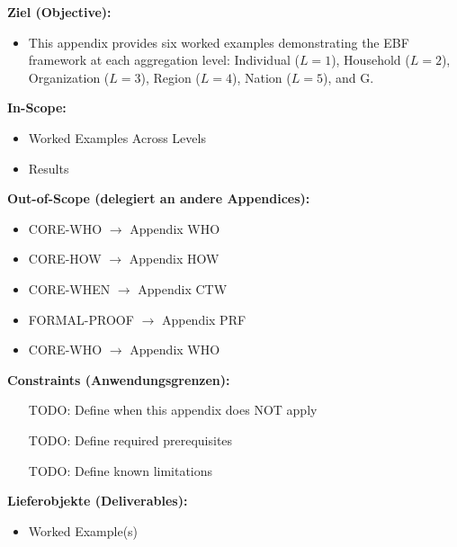 %
%
%


\begin{tcolorbox}[
    colback=orange!5!white,
    colframe=orange!75!black,
    title={\textbf{Appendix Scope: Ziel / In-Scope / Out-of-Scope / Constraints}},
    fonttitle=\bfseries
]

\textbf{Ziel (Objective):}
\begin{itemize}[nosep]
    \item This appendix provides six worked examples demonstrating the EBF framework
at each aggregation level: Individual ($L=1$), Household ($L=2$),
Organization ($L=3$), Region ($L=4$), Nation ($L=5$), and G.
\end{itemize}

\textbf{In-Scope:}
\begin{itemize}[nosep]
    \item Worked Examples Across Levels
    \item Results
\end{itemize}

\textbf{Out-of-Scope (delegiert an andere Appendices):}
\begin{itemize}[nosep]
    \item CORE-WHO $\rightarrow$ Appendix WHO
    \item CORE-HOW $\rightarrow$ Appendix HOW
    \item CORE-WHEN $\rightarrow$ Appendix CTW
    \item FORMAL-PROOF $\rightarrow$ Appendix PRF
    \item CORE-WHO $\rightarrow$ Appendix WHO
\end{itemize}

\textbf{Constraints (Anwendungsgrenzen):}
\begin{itemize}[nosep]
    \item [TODO: Define when this appendix does NOT apply]
    \item [TODO: Define required prerequisites]
    \item [TODO: Define known limitations]
\end{itemize}

\textbf{Lieferobjekte (Deliverables):}
\begin{itemize}[nosep]
    \item Worked Example(s)
\end{itemize}

\end{tcolorbox}


